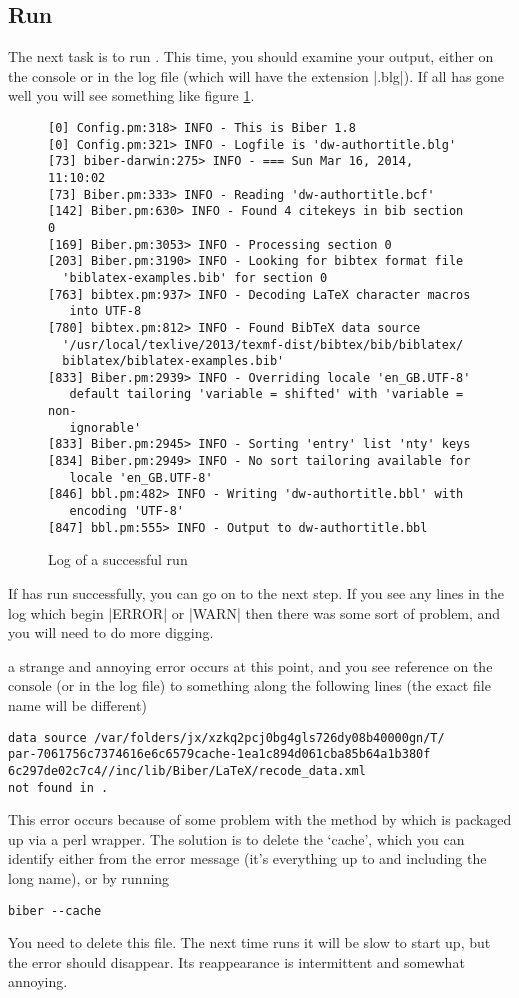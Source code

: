 \subsection{Run }

The next task is to run .
This time, you should examine your output, either on the console or in the log file (which will have the extension |.blg|). If all has gone well you will see something like figure \ref{biber:run}.
\begin{figure}
\begin{Verbatim}[frame=single,fontsize=\small]
[0] Config.pm:318> INFO - This is Biber 1.8
[0] Config.pm:321> INFO - Logfile is 'dw-authortitle.blg'
[73] biber-darwin:275> INFO - === Sun Mar 16, 2014, 11:10:02
[73] Biber.pm:333> INFO - Reading 'dw-authortitle.bcf'
[142] Biber.pm:630> INFO - Found 4 citekeys in bib section 0
[169] Biber.pm:3053> INFO - Processing section 0
[203] Biber.pm:3190> INFO - Looking for bibtex format file 
  'biblatex-examples.bib' for section 0
[763] bibtex.pm:937> INFO - Decoding LaTeX character macros 
   into UTF-8
[780] bibtex.pm:812> INFO - Found BibTeX data source 
  '/usr/local/texlive/2013/texmf-dist/bibtex/bib/biblatex/
  biblatex/biblatex-examples.bib'
[833] Biber.pm:2939> INFO - Overriding locale 'en_GB.UTF-8' 
   default tailoring 'variable = shifted' with 'variable = non-
   ignorable'
[833] Biber.pm:2945> INFO - Sorting 'entry' list 'nty' keys
[834] Biber.pm:2949> INFO - No sort tailoring available for
   locale 'en_GB.UTF-8'
[846] bbl.pm:482> INFO - Writing 'dw-authortitle.bbl' with 
   encoding 'UTF-8'
[847] bbl.pm:555> INFO - Output to dw-authortitle.bbl
\end{Verbatim}
\caption{Log of a successful  run\label{biber:run}}
\end{figure}

If  has run successfully, you can go on to the next step. If you see any lines in the log which begin |ERROR| or |WARN| then there was some sort of problem, and you will need to do more digging.

\label{cache} a strange and annoying error occurs at this point, and you see reference on the console (or in the log file) to something along the following lines (the exact file name will be different)
\begin{verbatim}
data source /var/folders/jx/xzkq2pcj0bg4gls726dy08b40000gn/T/
par-7061756c7374616e6c6579cache-1ea1c894d061cba85b64a1b380f
6c297de02c7c4//inc/lib/Biber/LaTeX/recode_data.xml 
not found in .
\end{verbatim}
This error occurs because of some problem with the method by which  is packaged up via a perl wrapper. The solution is to delete the `cache', which you can identify either from the error message (it's everything up to and including the long name), or by running
\begin{verbatim}
biber --cache
\end{verbatim}
You need to delete this file. The next time  runs it will be slow to start up, but the error should disappear. Its reappearance is intermittent and somewhat annoying.

